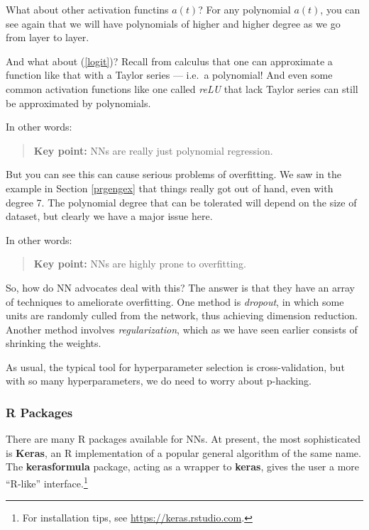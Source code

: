 What about other activation functins $a(t)$?  For any polynomial $a(t)$,
you can see again that we will have polynomials of higher and higher
degree as we go from layer to layer.

And what about (\ref{logit})?  Recall from calculus that one can
approximate a function like that with a Taylor series --- i.e.\ a
polynomial!  And even some common activation functions like one called
\textit{reLU} that lack Taylor series can still be approximated by
polynomials.

In other words:

\begin{quote}
\textbf{Key point:}  NNs are really just polynomial regression.
\end{quote}

But you can see this can cause serious problems of overfitting.  We saw
in the example in Section \ref{prgengex} that things really got out of
hand, even with degree 7.  The polynomial degree that can be tolerated
will depend on the size of dataset, but clearly we have a major issue
here.

In other words:

\begin{quote}
\textbf{Key point:}  NNs are highly prone to overfitting.
\end{quote}

So, how do NN advocates deal with this?  The answer is that they have an
array of techniques to ameliorate overfitting.  One method is
\textit{dropout}, in which some units are randomly culled from the
network, thus achieving dimension reduction.  Another method involves
\textit{regularization}, which as we have seen earlier consists of
shrinking the weights.

As usual, the typical tool for hyperparameter selection is
cross-validation, but with so many hyperparameters, we do need to worry
about p-hacking.

\subsubsection{R Packages}

There are many R packages available for NNs.  At present, the most
sophisticated is \textbf{Keras}, an R implementation of a popular
general algorithm of the same name.  The \textbf{kerasformula} package,
acting as a wrapper to \textbf{keras}, gives the user a more ``R-like''
interface.\footnote{For installation tips, see
\url{https://keras.rstudio.com}.}

